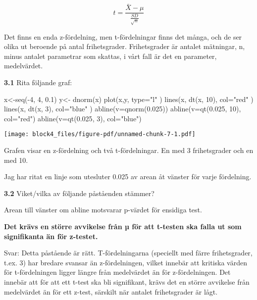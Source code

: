\documentclass[
  letterpaper,
  DIV=11,
  numbers=noendperiod]{scrartcl}
\newenvironment{Shaded}{\begin{snugshade}}{\end{snugshade}}
\newcommand{\AttributeTok}[1]{\textcolor[rgb]{0.40,0.45,0.13}{#1}}
\newcommand{\DecValTok}[1]{\textcolor[rgb]{0.68,0.00,0.00}{#1}}
\newcommand{\FloatTok}[1]{\textcolor[rgb]{0.68,0.00,0.00}{#1}}
\newcommand{\FunctionTok}[1]{\textcolor[rgb]{0.28,0.35,0.67}{#1}}
\newcommand{\NormalTok}[1]{\textcolor[rgb]{0.00,0.23,0.31}{#1}}
\newcommand{\OtherTok}[1]{\textcolor[rgb]{0.00,0.23,0.31}{#1}}
\newcommand{\SpecialCharTok}[1]{\textcolor[rgb]{0.37,0.37,0.37}{#1}}
\newcommand{\StringTok}[1]{\textcolor[rgb]{0.13,0.47,0.30}{#1}}
\begin{document}
\[
t = \frac{\bar{X} - \mu}{\frac{SD}{\sqrt{n}}}
\]

Det finns en enda z-fördelning, men t-fördelningar finns det många, och
de ser olika ut beroende på antal frihetsgrader. Frihetsgrader är
antalet mätningar, n, minus antalet parametrar som skattas, i vårt fall
är det en parameter, medelvärdet.

\textbf{3.1} Rita följande graf:

\begin{Shaded}
\begin{Highlighting}[]
\NormalTok{x}\OtherTok{\textless{}{-}}\FunctionTok{seq}\NormalTok{(}\SpecialCharTok{{-}}\DecValTok{4}\NormalTok{, }\DecValTok{4}\NormalTok{, }\FloatTok{0.1}\NormalTok{)}
\NormalTok{y}\OtherTok{\textless{}{-}} \FunctionTok{dnorm}\NormalTok{(x)}
\FunctionTok{plot}\NormalTok{(x,y, }\AttributeTok{type=}\StringTok{"l"}\NormalTok{ )}
\FunctionTok{lines}\NormalTok{(x, }\FunctionTok{dt}\NormalTok{(x, }\DecValTok{10}\NormalTok{), }\AttributeTok{col=}\StringTok{"red"}\NormalTok{ )}
\FunctionTok{lines}\NormalTok{(x, }\FunctionTok{dt}\NormalTok{(x, }\DecValTok{3}\NormalTok{), }\AttributeTok{col=}\StringTok{"blue"}\NormalTok{ )}
\FunctionTok{abline}\NormalTok{(}\AttributeTok{v=}\FunctionTok{qnorm}\NormalTok{(}\FloatTok{0.025}\NormalTok{))}
\FunctionTok{abline}\NormalTok{(}\AttributeTok{v=}\FunctionTok{qt}\NormalTok{(}\FloatTok{0.025}\NormalTok{, }\DecValTok{10}\NormalTok{), }\AttributeTok{col=}\StringTok{"red"}\NormalTok{)}
\FunctionTok{abline}\NormalTok{(}\AttributeTok{v=}\FunctionTok{qt}\NormalTok{(}\FloatTok{0.025}\NormalTok{, }\DecValTok{3}\NormalTok{), }\AttributeTok{col=}\StringTok{"blue"}\NormalTok{)}
\end{Highlighting}
\end{Shaded}

\texttt{[image: block4\_files/figure-pdf/unnamed-chunk-7-1.pdf]}

Grafen visar en z-fördelning och två t-fördelningar. En med 3
frihetsgrader och en med 10.

Jag har ritat en linje som utesluter 0.025 av arean åt vänster för varje
fördelning.

\textbf{3.2} Viket/vilka av följande påståenden stämmer?

Arean till vänster om abline motsvarar p-värdet för ensidiga test.

\textbf{Det krävs en större avvikelse från µ för att t-testen ska falla
ut som signifikanta än för z-testet.}

\hfill\break
Svar: Detta påstående är rätt. T-fördelningarna (speciellt med färre
frihetsgrader, t.ex. 3) har bredare svansar än z-fördelningen, vilket
innebär att kritiska värden för t-fördelningen ligger längre från
medelvärdet än för z-fördelningen. Det innebär att för att ett t-test
ska bli signifikant, krävs det en större avvikelse från medelvärdet än
för ett z-test, särskilt när antalet frihetsgrader är lågt.\\
\end{document}
